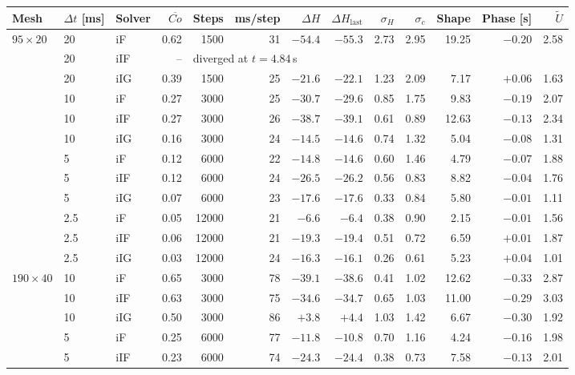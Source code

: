 \begin{tabular}{@{}lllrrrrrrrrrr@{}}
\toprule
Mesh & $\Delta t$ [ms] & Solver & $\overline{Co}$ & Steps & ms/step & $\Delta H$ & $\Delta H_\mathrm{last}$ & $\sigma_H$ & $\sigma_{c}$ & Shape & Phase [s] & $\tilde{U}$ \\
\midrule
$95\times20$ & 20 & iF & 0.62 & 1500 & 31 & $-54.4$ & $-55.3$ & 2.73 & 2.95 & 19.25 & $-0.20$ & 2.58 \\
 & 20 & iIF & -- & \multicolumn{9}{l}{diverged at $t = 4.84$\,s} \\
 & 20 & iIG & 0.39 & 1500 & 25 & $-21.6$ & $-22.1$ & 1.23 & 2.09 & 7.17 & $+0.06$ & 1.63 \\
 & 10 & iF & 0.27 & 3000 & 25 & $-30.7$ & $-29.6$ & 0.85 & 1.75 & 9.83 & $-0.19$ & 2.07 \\
 & 10 & iIF & 0.27 & 3000 & 26 & $-38.7$ & $-39.1$ & 0.61 & 0.89 & 12.63 & $-0.13$ & 2.34 \\
 & 10 & iIG & 0.16 & 3000 & 24 & $-14.5$ & $-14.6$ & 0.74 & 1.32 & 5.04 & $-0.08$ & 1.31 \\
 & 5 & iF & 0.12 & 6000 & 22 & $-14.8$ & $-14.6$ & 0.60 & 1.46 & 4.79 & $-0.07$ & 1.88 \\
 & 5 & iIF & 0.12 & 6000 & 24 & $-26.5$ & $-26.2$ & 0.56 & 0.83 & 8.82 & $-0.04$ & 1.76 \\
 & 5 & iIG & 0.07 & 6000 & 23 & $-17.6$ & $-17.6$ & 0.33 & 0.84 & 5.80 & $-0.01$ & 1.11 \\
 & 2.5 & iF & 0.05 & 12000 & 21 & $-6.6$ & $-6.4$ & 0.38 & 0.90 & 2.15 & $-0.01$ & 1.56 \\
 & 2.5 & iIF & 0.06 & 12000 & 21 & $-19.3$ & $-19.4$ & 0.51 & 0.72 & 6.59 & $+0.01$ & 1.87 \\
 & 2.5 & iIG & 0.03 & 12000 & 24 & $-16.3$ & $-16.1$ & 0.26 & 0.61 & 5.23 & $+0.04$ & 1.01 \\
\midrule
$190\times40$ & 10 & iF & 0.65 & 3000 & 78 & $-39.1$ & $-38.6$ & 0.41 & 1.02 & 12.62 & $-0.33$ & 2.87 \\
 & 10 & iIF & 0.63 & 3000 & 75 & $-34.6$ & $-34.7$ & 0.65 & 1.03 & 11.00 & $-0.29$ & 3.03 \\
 & 10 & iIG & 0.50 & 3000 & 86 & $+3.8$ & $+4.4$ & 1.03 & 1.42 & 6.67 & $-0.30$ & 1.92 \\
 & 5 & iF & 0.25 & 6000 & 77 & $-11.8$ & $-10.8$ & 0.70 & 1.16 & 4.24 & $-0.16$ & 1.98 \\
 & 5 & iIF & 0.23 & 6000 & 74 & $-24.3$ & $-24.4$ & 0.38 & 0.73 & 7.58 & $-0.13$ & 2.01 \\

\end{tabular}
